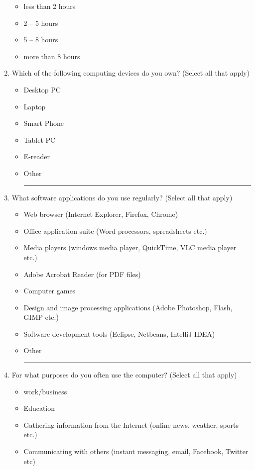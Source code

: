 \documentclass[doctor]{thesis} %
\theoremstyle{plain}
\begin{document}
\begin{enumerate}[topsep=-4em]
\begin{itemize}[topsep=-6em, label={o}]
\itemsep-1em 
\item less than 2 hours
\item 2 -- 5 hours
\item 5 -- 8 hours
\item more than 8 hours
\end{itemize}
\item Which of the following computing devices do you own? (Select all that apply)
\begin{itemize}[topsep=-6em, label={o}]
\itemsep-1em 
\item Desktop PC
\item Laptop
\item Smart Phone
\item Tablet PC
\item E-reader
\item Other \rule{4cm}{0.4pt}
\end{itemize}
\item What software applications do you use regularly? (Select all that apply)
\begin{itemize}[topsep=-6em, label={o}]
\itemsep-1em 
\item Web browser (Internet Explorer, Firefox, Chrome)
\item Office application suite (Word processors, spreadsheets etc.)
\item Media players (windows media player, QuickTime, VLC media player etc.)
\item Adobe Acrobat Reader (for PDF files)
\item Computer games
\item Design and image processing applications (Adobe Photoshop, Flash, GIMP etc.)
\item Software development tools (Eclipse, Netbeans, IntelliJ IDEA)
\item Other \rule{4cm}{0.4pt}
\end{itemize}
\item For what purposes do you often use the computer? (Select all that apply)
\begin{itemize}[topsep=-6em, label={o}]
\itemsep-1em 
\item work/business
\item Education
\item Gathering information from the Internet (online news, weather, sports etc.)
\item Communicating with others (instant messaging, email, Facebook, Twitter etc)

\end{itemize}
\end{enumerate}
\end{document}
